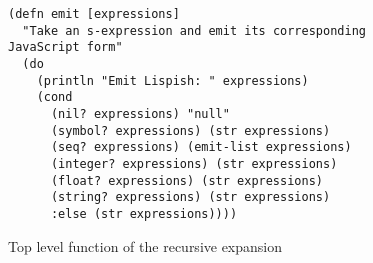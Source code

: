 \begin{figure}[ht]
\begin{verbatim}
(defn emit [expressions]
  "Take an s-expression and emit its corresponding JavaScript form"
  (do
    (println "Emit Lispish: " expressions)
    (cond
      (nil? expressions) "null"
      (symbol? expressions) (str expressions)
      (seq? expressions) (emit-list expressions)
      (integer? expressions) (str expressions)
      (float? expressions) (str expressions)
      (string? expressions) (str expressions)
      :else (str expressions))))
\end{verbatim}
\caption{Top level function of the recursive expansion}
\label{fig:emit}
\end{figure}
